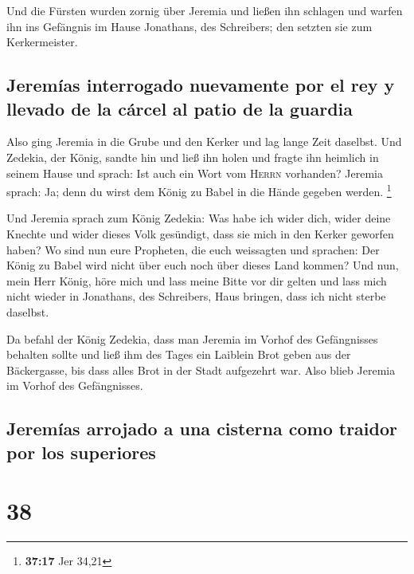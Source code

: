  Und die Fürsten wurden zornig über Jeremia und ließen
ihn schlagen und warfen ihn ins Gefängnis im Hause Jonathans, des
Schreibers; den setzten sie zum Kerkermeister.

\hypertarget{jeremuxedas-interrogado-nuevamente-por-el-rey-y-llevado-de-la-cuxe1rcel-al-patio-de-la-guardia}{%
\subsection{Jeremías interrogado nuevamente por el rey y llevado de la
cárcel al patio de la
guardia}\label{jeremuxedas-interrogado-nuevamente-por-el-rey-y-llevado-de-la-cuxe1rcel-al-patio-de-la-guardia}}

 Also ging Jeremia in die Grube und den Kerker und lag
lange Zeit daselbst.  Und Zedekia, der König, sandte hin
und ließ ihn holen und fragte ihn heimlich in seinem Hause und sprach:
Ist auch ein Wort vom \textsc{Herrn} vorhanden? Jeremia sprach: Ja; denn
du wirst dem König zu Babel in die Hände gegeben werden. \footnote{\textbf{37:17}
  Jer 34,21}

 Und Jeremia sprach zum König Zedekia: Was habe ich wider
dich, wider deine Knechte und wider dieses Volk gesündigt, dass sie mich
in den Kerker geworfen haben?  Wo sind nun eure
Propheten, die euch weissagten und sprachen: Der König zu Babel wird
nicht über euch noch über dieses Land kommen?  Und nun,
mein Herr König, höre mich und lass meine Bitte vor dir gelten und lass
mich nicht wieder in Jonathans, des Schreibers, Haus bringen, dass ich
nicht sterbe daselbst.

 Da befahl der König Zedekia, dass man Jeremia im Vorhof
des Gefängnisses behalten sollte und ließ ihm des Tages ein Laiblein
Brot geben aus der Bäckergasse, bis dass alles Brot in der Stadt
aufgezehrt war. Also blieb Jeremia im Vorhof des Gefängnisses.

\hypertarget{jeremuxedas-arrojado-a-una-cisterna-como-traidor-por-los-superiores}{%
\subsection{Jeremías arrojado a una cisterna como traidor por los
superiores}\label{jeremuxedas-arrojado-a-una-cisterna-como-traidor-por-los-superiores}}

\hypertarget{section-37}{%
\section{38}\label{section-37}}

